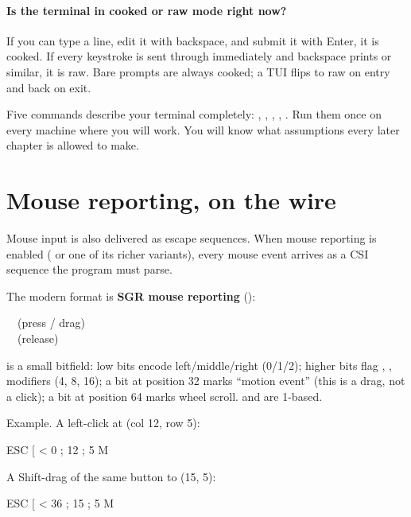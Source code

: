 \paragraph{Is the terminal in cooked or raw mode right now?}
If you can type a line, edit it with backspace, and submit it with
Enter, it is cooked. If every keystroke is sent through immediately
and backspace prints  or similar, it is raw. Bare prompts are
always cooked; a TUI flips to raw on entry and back on exit.

\begin{idea}
Five commands describe your terminal completely:
, , ,
, . Run them once on every
machine where you will work. You will know what assumptions every
later chapter is allowed to make.
\end{idea}

\section{Mouse reporting, on the wire}
\label{sec:term:mouse}

Mouse input is also delivered as escape sequences. When mouse
reporting is enabled (\code{ESC [ ?1000 h} or one of its richer
variants), every mouse event arrives as a CSI sequence the program
must parse.

The modern format is \textbf{SGR mouse reporting} ():

\begin{center}
\small
\code{ESC [ < button ; column ; row M}~~(press / drag) \\
\code{ESC [ < button ; column ; row m}~~(release)
\end{center}

 is a small bitfield: low bits encode left/middle/right
(0/1/2); higher bits flag , , 
modifiers (4, 8, 16); a bit at position 32 marks ``motion event''
(this is a drag, not a click); a bit at position 64 marks wheel
scroll.  and  are 1-based.

Example. A left-click at (col 12, row 5):

\begin{terminalbox}
ESC [ < 0 ; 12 ; 5 M
\end{terminalbox}

A Shift-drag of the same button to (15, 5):

\begin{terminalbox}
ESC [ < 36 ; 15 ; 5 M
\end{terminalbox}

